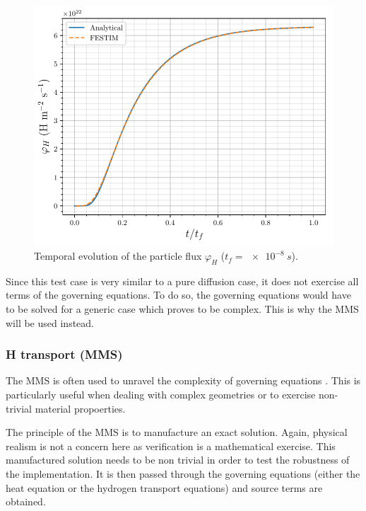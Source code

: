 \begin{figure}
    \centering
    \includegraphics[width=\linewidth]{Figures/Chapter3/FESTIM_vs_analytical.pdf}
    \caption{Temporal evolution of the particle flux $\varphi_H$ ($t_f = \SI{e-8}{s}$).}
    \label{fig:FESTIM vs analytical}
\end{figure}

Since this test case is very similar to a pure diffusion case, it does not exercise all terms of the governing equations.
To do so, the governing equations would have to be solved for a generic case which proves to be complex.
This is why the MMS will be used instead.

\subsubsection{H transport (MMS)} \label{mms}

The MMS is often used to unravel the complexity of governing equations .
This is particularly useful when dealing with complex geometries or to exercise non-trivial material propoerties.

The principle of the MMS is to manufacture an exact solution.
Again, physical realism is not a concern here as verification is a mathematical exercise.
This manufactured solution needs to be non trivial in order to test the robustness of the implementation.
It is then passed through the governing equations (either the heat equation or the hydrogen transport equations) and source terms are obtained.

